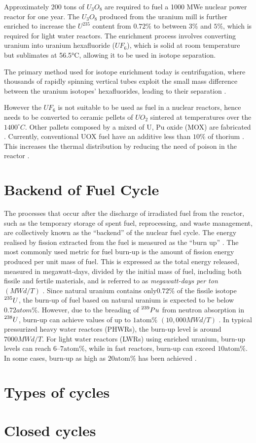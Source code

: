 Approximately 200 tons of \(U_3O_8\) are required to fuel a 1000 MWe nuclear power reactor for one year. The \(U_3O_8\) produced from the uranium mill is further enriched to increase the \(U^{235}\) content from \(0.72\%\) to between \(3\%\) and \(5\%\), which is required for light water reactors. The enrichment process involves converting uranium into uranium hexafluoride (\(UF_6\)), which is solid at room temperature but sublimates at 56.5°C, allowing it to be used in isotope separation.

The primary method used for isotope enrichment today is centrifugation, where thousands of rapidly spinning vertical tubes exploit the small mass difference between the uranium isotopes' hexafluorides, leading to their separation \cite{fuel_cycle_book}.

However the \(UF_6\) is not suitable to be used as fuel in a nuclear reactors, hence needs to be converted to ceramic pellets of \(UO_2\) sintered at temperatures over the \(1400^{\circ}C\). Other pallets composed by a mixed of U, Pu oxide (MOX) are fabricated \cite{fuel_cycle_book}. Currently, conventional UOX fuel have an additive less than \(10\%\) of thorium . This increases the thermal distribution by reducing the need of poison in the reactor \cite{Th_cycle_viability}.

\section{Backend of Fuel Cycle}

The processes that occur after the discharge of irradiated fuel from the reactor, such as the temporary storage of spent fuel, reprocessing, and waste management, are collectively known as the ``backend'' of the nuclear fuel cycle. The energy realised by fission extracted from the fuel is measured as the ``burn up'' \cite{fuel_cycle_book}. The most commonly used metric for fuel burn-up is the amount of fission energy produced per unit mass of fuel. This is expressed as the total energy released, measured in megawatt-days, divided by the initial mass of fuel, including both fissile and fertile materials, and is referred to as \textit{megawatt-days per ton} \((MWd/T)\) \cite{nuclear_reactors_adv}. Since natural uranium contains only\( 0.72\%\) of the fissile isotope \(\prescript{235}{}{U}\), the burn-up of fuel based on natural uranium is expected to be below \(0.72 atom\%\). However, due to the breading of \(\prescript{239}{}{Pu}\) from neutron absorption in \(\prescript{238}{}{U}\), burn-up can achieve values of up to \(1 \text{atom} \%\) \((10,000 MWd/T)\) \cite{fuel_cycle_book}. In typical pressurized heavy water reactors (PHWRs), the burn-up level is around \(7000 MWd/T\). For light water reactors (LWRs) using enriched uranium, burn-up levels can reach \(6–7 \text{atom} \%\), while in fast reactors, burn-up can exceed \(10 \text{atom} \%\). In some cases, burn-up as high as \(20 \text{atom} \%\) has been achieved \cite{fuel_cycle_book}.



\section{Types of cycles}

\section{Closed cycles}
